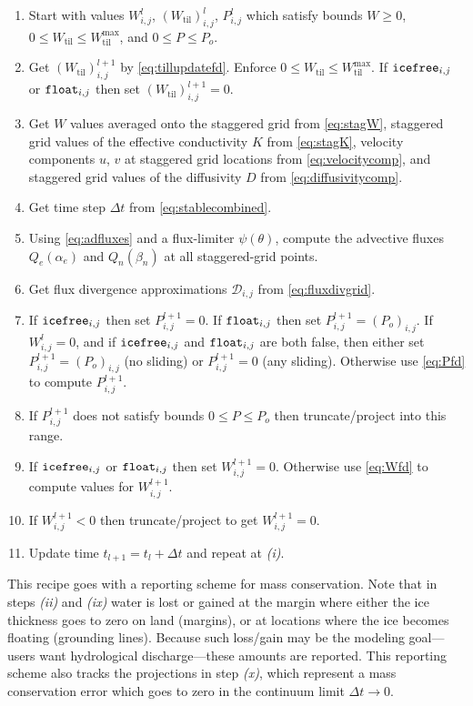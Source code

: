\documentclass[gmd]{copernicus}   %
\newcommand{\text}{\textrm}
\newcommand{\Wtil}{W_{\text{til}}}
\newcommand{\Wtilmax}{W_{\text{til}}^{\text{max}}}
\newcommand{\Wlij}{W^l_{i,j}}
\newcommand{\Plij}{P^l_{i,j}}
\begin{document}
\renewcommand{\labelenumi}{\emph{(\roman{enumi})}}
\begin{enumerate}
\item Start with values $\Wlij$, $(\Wtil)_{i,j}^l$, $\Plij$ which satisfy bounds $W\ge 0$, $0\le \Wtil \le \Wtilmax$, and $0 \le P \le P_o$.
\item Get $(\Wtil)_{i,j}^{l+1}$ by \eqref{eq:tillupdatefd}.  Enforce $0\le \Wtil \le \Wtilmax$.  If $\text{\texttt{icefree}}_{i,j}$ or $\text{\texttt{float}}_{i,j}$ then set $(\Wtil)_{i,j}^{l+1}=0$.
\item Get $W$ values averaged onto the staggered grid from \eqref{eq:stagW}, staggered grid values of the effective conductivity $K$ from \eqref{eq:stagK}, velocity components $u$, $v$ at staggered grid locations from \eqref{eq:velocitycomp}, and staggered grid values of the diffusivity $D$ from \eqref{eq:diffusivitycomp}.
\item Get time step $\Delta t$ from \eqref{eq:stablecombined}.
\item Using \eqref{eq:adfluxes} and a flux-limiter $\psi(\theta)$, compute the advective fluxes $Q_e(\alpha_e)$ and $Q_n(\beta_n)$ at all staggered-grid points.
\item Get flux divergence approximations $\mathcal{D}_{i,j}$ from \eqref{eq:fluxdivgrid}.
\item If $\text{\texttt{icefree}}_{i,j}$ then set $P_{i,j}^{l+1}=0$.  If $\text{\texttt{float}}_{i,j}$ then set $P_{i,j}^{l+1} = (P_o)_{i,j}$.  If $\Wlij=0$, and if $\text{\texttt{icefree}}_{i,j}$ and $\text{\texttt{float}}_{i,j}$ are both false, then either set $P_{i,j}^{l+1} = (P_o)_{i,j}$ (no sliding) or $P_{i,j}^{l+1} = 0$ (any sliding).  Otherwise use \eqref{eq:Pfd} to compute $P_{i,j}^{l+1}$.
\item If $P_{i,j}^{l+1}$ does not satisfy bounds $0 \le P \le P_o$ then truncate/project into this range.
\item If $\text{\texttt{icefree}}_{i,j}$ or $\text{\texttt{float}}_{i,j}$ then set $W_{i,j}^{l+1}=0$.  Otherwise use \eqref{eq:Wfd} to compute values for $W_{i,j}^{l+1}$.
\item If $W_{i,j}^{l+1}<0$ then truncate/project to get $W_{i,j}^{l+1}=0$.
\item Update time $t_{l+1}=t_l+\Delta t$ and repeat at \emph{(i)}.
\end{enumerate}

\medskip
This recipe goes with a reporting scheme for mass conservation.  Note that in steps \emph{(ii)} and \emph{(ix)} water is lost or gained at the margin where either the ice thickness goes to zero on land (margins), or at locations where the ice becomes floating (grounding lines).  Because such loss/gain may be the modeling goal---users want hydrological discharge---these amounts are reported.  This reporting scheme also tracks the projections in step \emph{(x)}, which represent a mass conservation error which goes to zero in the continuum limit $\Delta t\to 0$.
\end{document}
